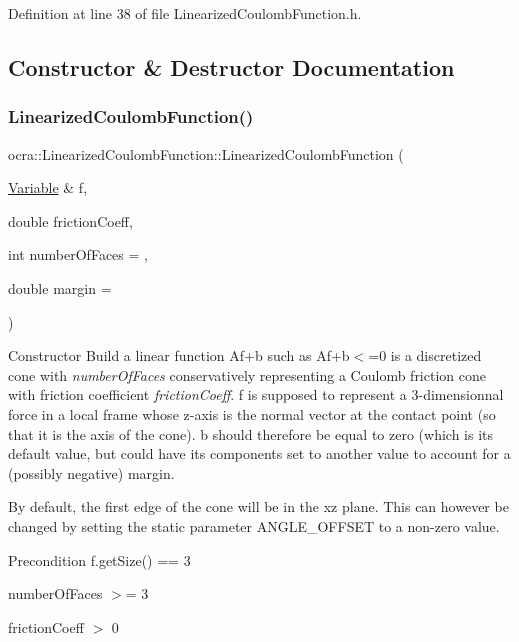Definition at line 38 of file Linearized\+Coulomb\+Function.\+h.



\subsection{Constructor \& Destructor Documentation}
\hypertarget{classocra_1_1LinearizedCoulombFunction_af80b2f4c57d291f389f4e9e4435f3baa}{}\label{classocra_1_1LinearizedCoulombFunction_af80b2f4c57d291f389f4e9e4435f3baa} 
\subsubsection{\texorpdfstring{Linearized\+Coulomb\+Function()}{LinearizedCoulombFunction()}}
{\footnotesize\ttfamily ocra\+::\+Linearized\+Coulomb\+Function\+::\+Linearized\+Coulomb\+Function (\begin{DoxyParamCaption}\item[{\hyperlink{classocra_1_1Variable}{Variable} \&}]{f,  }\item[{double}]{friction\+Coeff,  }\item[{int}]{number\+Of\+Faces = {},  }\item[{double}]{margin = {} }\end{DoxyParamCaption})}

Constructor Build a linear function Af+b such as Af+b$<$=0 is a discretized cone with {\itshape number\+Of\+Faces} conservatively representing a Coulomb friction cone with friction coefficient {\itshape friction\+Coeff}. f is supposed to represent a 3-\/dimensionnal force in a local frame whose z-\/axis is the normal vector at the contact point (so that it is the axis of the cone). b should therefore be equal to zero (which is its default value, but could have its components set to another value to account for a (possibly negative) margin.

By default, the first edge of the cone will be in the xz plane. This can however be changed by setting the static parameter A\+N\+G\+L\+E\+\_\+\+O\+F\+F\+S\+ET to a non-\/zero value.

\begin{DoxyPrecond}{Precondition}
f.\+get\+Size() == 3 

number\+Of\+Faces $>$= 3 

friction\+Coeff $>$ 0 
\end{DoxyPrecond}


